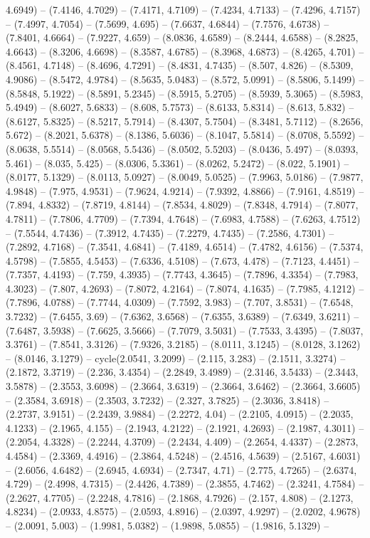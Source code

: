 4.6949) -- (7.4146, 4.7029) -- (7.4171, 4.7109) -- (7.4234, 4.7133) -- (7.4296, 4.7157) -- (7.4997, 4.7054) -- (7.5699, 4.695) -- (7.6637, 4.6844) -- (7.7576, 4.6738) -- (7.8401, 4.6664) -- (7.9227, 4.659) -- (8.0836, 4.6589) -- (8.2444, 4.6588) -- (8.2825, 4.6643) -- (8.3206, 4.6698) -- (8.3587, 4.6785) -- (8.3968, 4.6873) -- (8.4265, 4.701) -- (8.4561, 4.7148) -- (8.4696, 4.7291) -- (8.4831, 4.7435) -- (8.507, 4.826) -- (8.5309, 4.9086) -- (8.5472, 4.9784) -- (8.5635, 5.0483) -- (8.572, 5.0991) -- (8.5806, 5.1499) -- (8.5848, 5.1922) -- (8.5891, 5.2345) -- (8.5915, 5.2705) -- (8.5939, 5.3065) -- (8.5983, 5.4949) -- (8.6027, 5.6833) -- (8.608, 5.7573) -- (8.6133, 5.8314) -- (8.613, 5.832) -- (8.6127, 5.8325) -- (8.5217, 5.7914) -- (8.4307, 5.7504) -- (8.3481, 5.7112) -- (8.2656, 5.672) -- (8.2021, 5.6378) -- (8.1386, 5.6036) -- (8.1047, 5.5814) -- (8.0708, 5.5592) -- (8.0638, 5.5514) -- (8.0568, 5.5436) -- (8.0502, 5.5203) -- (8.0436, 5.497) -- (8.0393, 5.461) -- (8.035, 5.425) -- (8.0306, 5.3361) -- (8.0262, 5.2472) -- (8.022, 5.1901) -- (8.0177, 5.1329) -- (8.0113, 5.0927) -- (8.0049, 5.0525) -- (7.9963, 5.0186) -- (7.9877, 4.9848) -- (7.975, 4.9531) -- (7.9624, 4.9214) -- (7.9392, 4.8866) -- (7.9161, 4.8519) -- (7.894, 4.8332) -- (7.8719, 4.8144) -- (7.8534, 4.8029) -- (7.8348, 4.7914) -- (7.8077, 4.7811) -- (7.7806, 4.7709) -- (7.7394, 4.7648) -- (7.6983, 4.7588) -- (7.6263, 4.7512) -- (7.5544, 4.7436) -- (7.3912, 4.7435) -- (7.2279, 4.7435) -- (7.2586, 4.7301) -- (7.2892, 4.7168) -- (7.3541, 4.6841) -- (7.4189, 4.6514) -- (7.4782, 4.6156) -- (7.5374, 4.5798) -- (7.5855, 4.5453) -- (7.6336, 4.5108) -- (7.673, 4.478) -- (7.7123, 4.4451) -- (7.7357, 4.4193) -- (7.759, 4.3935) -- (7.7743, 4.3645) -- (7.7896, 4.3354) -- (7.7983, 4.3023) -- (7.807, 4.2693) -- (7.8072, 4.2164) -- (7.8074, 4.1635) -- (7.7985, 4.1212) -- (7.7896, 4.0788) -- (7.7744, 4.0309) -- (7.7592, 3.983) -- (7.707, 3.8531) -- (7.6548, 3.7232) -- (7.6455, 3.69) -- (7.6362, 3.6568) -- (7.6355, 3.6389) -- (7.6349, 3.6211) -- (7.6487, 3.5938) -- (7.6625, 3.5666) -- (7.7079, 3.5031) -- (7.7533, 3.4395) -- (7.8037, 3.3761) -- (7.8541, 3.3126) -- (7.9326, 3.2185) -- (8.0111, 3.1245) -- (8.0128, 3.1262) -- (8.0146, 3.1279) -- cycle(2.0541, 3.2099) -- (2.115, 3.283) -- (2.1511, 3.3274) -- (2.1872, 3.3719) -- (2.236, 3.4354) -- (2.2849, 3.4989) -- (2.3146, 3.5433) -- (2.3443, 3.5878) -- (2.3553, 3.6098) -- (2.3664, 3.6319) -- (2.3664, 3.6462) -- (2.3664, 3.6605) -- (2.3584, 3.6918) -- (2.3503, 3.7232) -- (2.327, 3.7825) -- (2.3036, 3.8418) -- (2.2737, 3.9151) -- (2.2439, 3.9884) -- (2.2272, 4.04) -- (2.2105, 4.0915) -- (2.2035, 4.1233) -- (2.1965, 4.155) -- (2.1943, 4.2122) -- (2.1921, 4.2693) -- (2.1987, 4.3011) -- (2.2054, 4.3328) -- (2.2244, 4.3709) -- (2.2434, 4.409) -- (2.2654, 4.4337) -- (2.2873, 4.4584) -- (2.3369, 4.4916) -- (2.3864, 4.5248) -- (2.4516, 4.5639) -- (2.5167, 4.6031) -- (2.6056, 4.6482) -- (2.6945, 4.6934) -- (2.7347, 4.71) -- (2.775, 4.7265) -- (2.6374, 4.729) -- (2.4998, 4.7315) -- (2.4426, 4.7389) -- (2.3855, 4.7462) -- (2.3241, 4.7584) -- (2.2627, 4.7705) -- (2.2248, 4.7816) -- (2.1868, 4.7926) -- (2.157, 4.808) -- (2.1273, 4.8234) -- (2.0933, 4.8575) -- (2.0593, 4.8916) -- (2.0397, 4.9297) -- (2.0202, 4.9678) -- (2.0091, 5.003) -- (1.9981, 5.0382) -- (1.9898, 5.0855) -- (1.9816, 5.1329) -- 